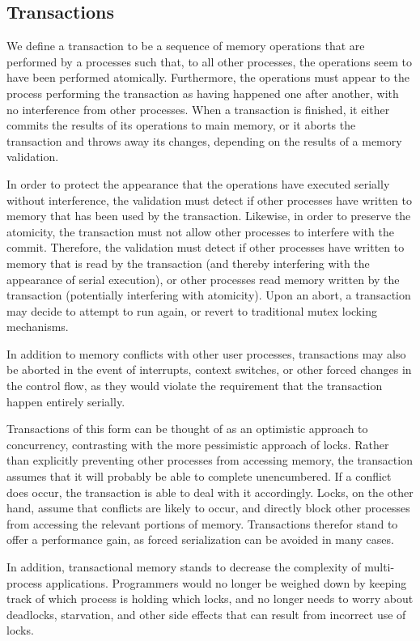 \documentclass{acm_proc_article-sp}
\begin{document}
\subsection{Transactions}
We define a transaction to be a sequence of memory operations that are 
performed by a processes such that, to all other processes, the operations 
seem to have been performed atomically. Furthermore, the operations must 
appear to the process performing the transaction as having happened one after 
another, with no interference from other processes. When a transaction is finished,
 it either commits the results of its operations to main memory, or it aborts 
the transaction and throws away its changes, depending on the results of a
memory validation.

In order to protect the appearance that the operations have executed serially
without interference, the validation must detect if other processes have 
written to memory that has been used by the transaction. Likewise, in order
to preserve the atomicity, the transaction must not allow other processes
to interfere with the commit. Therefore, the validation must detect if 
other processes have written to memory that is read by the transaction 
(and thereby interfering with the appearance of serial execution), or other 
processes read memory written by the transaction (potentially interfering
with atomicity). Upon an abort, a transaction may decide to attempt to run 
again, or revert to traditional mutex locking mechanisms.~\cite{Herlihy:1993:TMA:173682.165164}

In addition to memory conflicts with other user processes, 
transactions may also be aborted in the event of interrupts, context switches,
or other forced changes in the control flow, as they would violate the
requirement that the transaction happen entirely serially. 

Transactions of this form can be thought of as an optimistic approach to
concurrency, contrasting with the more pessimistic approach of locks. 
Rather than explicitly preventing other processes from accessing memory, the
transaction assumes that it will probably be able to complete unencumbered. If
a conflict does occur, the transaction is able to deal with it accordingly.
Locks, on the other hand, assume that conflicts are likely to occur, and 
directly block other processes from accessing the relevant portions of memory.
Transactions therefor stand to offer a performance gain, as forced 
serialization can be avoided in many cases.

In addition, transactional memory stands to decrease the complexity of 
multi-process applications. Programmers would no longer be weighed down by 
keeping track of which process is holding which locks, and no longer needs
to worry about deadlocks, starvation, and other side effects that can result
from incorrect use of locks.
\end{document}
